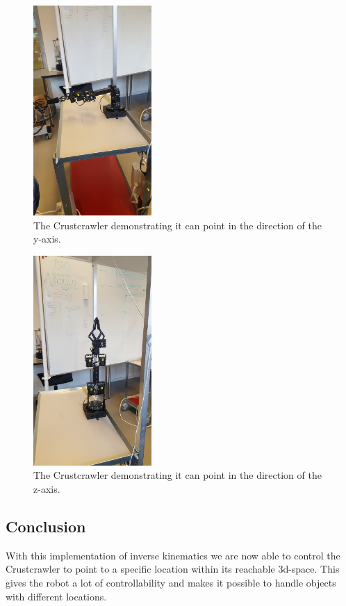 \begin{figure}[H]
    \centering
    \includegraphics[width=0.4\textwidth,trim={0 25cm 0 18cm},clip]{figures/y.jpg}
    \caption{The Crustcrawler demonstrating it can point in the direction of the y-axis.}
    \label{fig:my_label}
\end{figure}

\begin{figure}[H]
    \centering
    \includegraphics[width=0.4\textwidth,trim={0 15cm 0 18cm},clip]{figures/z.jpg}
    \caption{The Crustcrawler demonstrating it can point in the direction of the z-axis.}
    \label{fig:my_label}
\end{figure}

\subsection{Conclusion}

With this implementation of inverse kinematics we are now able to control the Crustcrawler to point to a specific location within its reachable 3d-space. This gives the robot a lot of controllability and makes it possible to handle objects with different locations.
